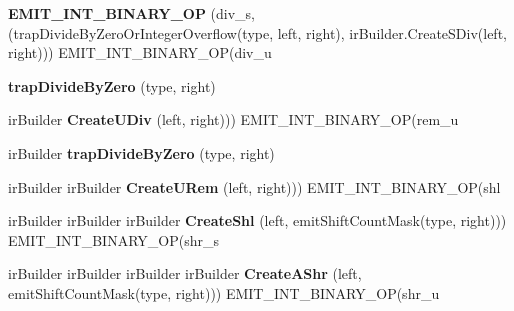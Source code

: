 \begin{DoxyCompactItemize}
{\bfseries E\+M\+I\+T\+\_\+\+I\+N\+T\+\_\+\+B\+I\+N\+A\+R\+Y\+\_\+\+OP} (div\+\_\+s,(trap\+Divide\+By\+Zero\+Or\+Integer\+Overflow(type, left, right), ir\+Builder.\+Create\+S\+Div(left, right))) E\+M\+I\+T\+\_\+\+I\+N\+T\+\_\+\+B\+I\+N\+A\+R\+Y\+\_\+\+OP(div\+\_\+u
\item 
\mbox{\label{struct_l_l_v_m_j_i_t_1_1_emit_function_context_a0bc2a1c5b762f54fa19afcafb0651824}} 
{\bfseries trap\+Divide\+By\+Zero} (type, right)
\item 
\mbox{\label{struct_l_l_v_m_j_i_t_1_1_emit_function_context_a0e9da3c750b1d182f21239a43a093d8f}} 
ir\+Builder {\bfseries Create\+U\+Div} (left, right))) E\+M\+I\+T\+\_\+\+I\+N\+T\+\_\+\+B\+I\+N\+A\+R\+Y\+\_\+\+OP(rem\+\_\+u
\item 
\mbox{\label{struct_l_l_v_m_j_i_t_1_1_emit_function_context_ab7b1a45cda72dcd804159c444ad2ed8a}} 
ir\+Builder {\bfseries trap\+Divide\+By\+Zero} (type, right)
\item 
\mbox{\label{struct_l_l_v_m_j_i_t_1_1_emit_function_context_a569c0cf07e0328a82cfdefe356e126da}} 
ir\+Builder ir\+Builder {\bfseries Create\+U\+Rem} (left, right))) E\+M\+I\+T\+\_\+\+I\+N\+T\+\_\+\+B\+I\+N\+A\+R\+Y\+\_\+\+OP(shl
\item 
\mbox{\label{struct_l_l_v_m_j_i_t_1_1_emit_function_context_ae5429db3297c4f7d8473bf9e23ab9094}} 
ir\+Builder ir\+Builder ir\+Builder {\bfseries Create\+Shl} (left, emit\+Shift\+Count\+Mask(type, right))) E\+M\+I\+T\+\_\+\+I\+N\+T\+\_\+\+B\+I\+N\+A\+R\+Y\+\_\+\+OP(shr\+\_\+s
\item 
\mbox{\label{struct_l_l_v_m_j_i_t_1_1_emit_function_context_aa6182b1c3531bc3c4d7829d3a07f17d6}} 
ir\+Builder ir\+Builder ir\+Builder ir\+Builder {\bfseries Create\+A\+Shr} (left, emit\+Shift\+Count\+Mask(type, right))) E\+M\+I\+T\+\_\+\+I\+N\+T\+\_\+\+B\+I\+N\+A\+R\+Y\+\_\+\+OP(shr\+\_\+u
\item 
\mbox{\label{struct_l_l_v_m_j_i_t_1_1_emit_function_context_a2902408fa8844554efd473409152aa91}} 

\end{DoxyCompactItemize}
